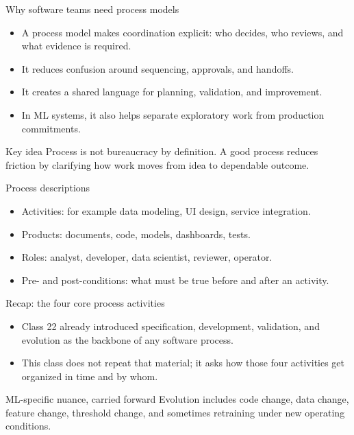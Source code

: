 \begin{frame}{Why software teams need process models}
\begin{itemize}
\item A process model makes coordination explicit: who decides, who reviews, and what evidence is required.
\item It reduces confusion around sequencing, approvals, and handoffs.
\item It creates a shared language for planning, validation, and improvement.
\item In ML systems, it also helps separate exploratory work from production commitments.
\end{itemize}
\begin{block}{Key idea}
Process is not bureaucracy by definition. A good process reduces friction by clarifying how work moves from idea to dependable outcome.
\end{block}
\coursefooter
\end{frame}

\begin{frame}{Process descriptions}
\begin{itemize}
\item Activities: for example data modeling, UI design, service integration.
\item Products: documents, code, models, dashboards, tests.
\item Roles: analyst, developer, data scientist, reviewer, operator.
\item Pre- and post-conditions: what must be true before and after an activity.
\end{itemize}
\coursefooter
\end{frame}

\begin{frame}{Recap: the four core process activities}
\begin{itemize}
\item Class 22 already introduced specification, development, validation, and evolution as the backbone of any software process.
\item This class does not repeat that material; it asks how those four activities get organized in time and by whom.
\end{itemize}
\begin{block}{ML-specific nuance, carried forward}
Evolution includes code change, data change, feature change, threshold change, and sometimes retraining under new operating conditions.
\end{block}
\coursefooter
\end{frame}

